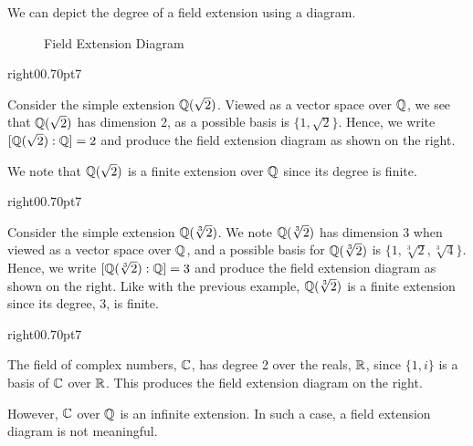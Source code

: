 We can depict the degree of a field extension using a diagram.
\begin{figure}[H]
    \centering
    \caption{Field Extension Diagram}
\end{figure}

\begin{examplewithcutout}{right}{0}{0.7\textwidth}{0pt}{7}{
    \begin{figure}[H]
        \centering
    \end{figure}
}
    Consider the simple extension $\mathbb{Q}(\sqrt2)$. Viewed as a vector space over $\mathbb{Q}$, we see that $\mathbb{Q}(\sqrt 2)$ has dimension 2, as a possible basis is $\{1, \sqrt2\}$. Hence, we write $[\mathbb{Q}(\sqrt2):\mathbb{Q}] = 2$ and produce the field extension diagram as shown on the right.

    We note that $\mathbb{Q}(\sqrt2)$ is a finite extension over $\mathbb{Q}$ since its degree is finite.
\end{examplewithcutout}

\begin{examplewithcutout}{right}{0}{0.7\textwidth}{0pt}{7}{
    \begin{figure}[H]
        \centering
    \end{figure}
}
    Consider the simple extension $\mathbb{Q}(\sqrt[3]2)$. We note $\mathbb{Q}(\sqrt[3]2)$ has dimension 3 when viewed as a vector space over $\mathbb{Q}$, and a possible basis for $\mathbb{Q}(\sqrt[3]2)$ is $\{1, \sqrt[3]2, \sqrt[3]4\}$. Hence, we write $[\mathbb{Q}(\sqrt[3]2):\mathbb{Q}] = 3$ and produce the field extension diagram as shown on the right. Like with the previous example, $\mathbb{Q}(\sqrt[3]2)$ is a finite extension since its degree, 3, is finite.
\end{examplewithcutout}

\begin{examplewithcutout}{right}{0}{0.7\textwidth}{0pt}{7}{
    \begin{figure}[H]
        \centering
    \end{figure}
}
    The field of complex numbers, $\mathbb{C}$, has degree 2 over the reals, $\mathbb{R}$, since $\{1, i\}$ is a basis of $\mathbb{C}$ over $\mathbb{R}$. This produces the field extension diagram on the right.
    
    However, $\mathbb{C}$ over $\mathbb{Q}$ is an infinite extension. In such a case, a field extension diagram is not meaningful.
\end{examplewithcutout}

